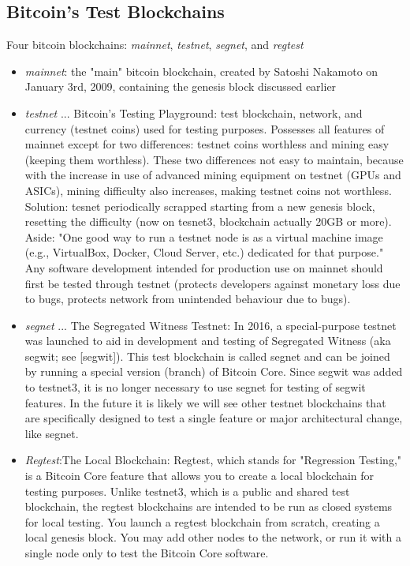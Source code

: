 \documentclass[english, 11pt]{article}
\begin{document}
\subsection{Bitcoin’s Test Blockchains}
\noindent Four bitcoin blockchains: \textit{mainnet}, \textit{testnet}, \textit{segnet}, and \textit{regtest}
\begin{itemize}
    \item \textit{mainnet}: the "main" bitcoin blockchain, created by Satoshi Nakamoto on January 3rd, 2009, containing the genesis block discussed earlier
    \item \textit{testnet} ... Bitcoin’s Testing Playground: test blockchain, network, and currency (testnet coins) used for testing purposes. Possesses all features of mainnet except for two differences: testnet coins worthless and mining easy (keeping them worthless). These two differences not easy to maintain, because with the increase in use of advanced mining equipment on testnet (GPUs and ASICs), mining difficulty also increases, making testnet coins not worthless. Solution: tesnet periodically scrapped starting from a new genesis block, resetting the difficulty (now on tesnet3, blockchain actually 20GB or more). Aside: "One good way to run a testnet node is as a virtual machine image (e.g., VirtualBox, Docker, Cloud Server, etc.) dedicated for that purpose." Any software development intended for production use on mainnet should first be tested through testnet (protects developers against monetary loss due to bugs, protects network from unintended behaviour due to bugs).
    \item \textit{segnet} ... The Segregated Witness Testnet: In 2016, a special-purpose testnet was launched to aid in development and testing of Segregated Witness (aka segwit; see [segwit]). This test blockchain is called segnet and can be joined by running a special version (branch) of Bitcoin Core. Since segwit was added to testnet3, it is no longer necessary to use segnet for testing of segwit features. In the future it is likely we will see other testnet blockchains that are specifically designed to test a single feature or major architectural change, like segnet.
    \item \textit{Regtest}:The Local Blockchain: Regtest, which stands for "Regression Testing," is a Bitcoin Core feature that allows you to create a local blockchain for testing purposes. Unlike testnet3, which is a public and shared test blockchain, the regtest blockchains are intended to be run as closed systems for local testing. You launch a regtest blockchain from scratch, creating a local genesis block. You may add other nodes to the network, or run it with a single node only to test the Bitcoin Core software.
\end{itemize}
\end{document}

